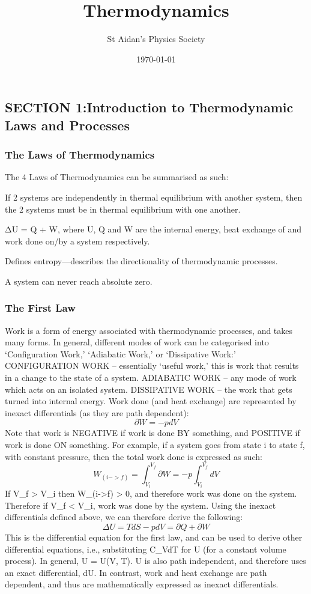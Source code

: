\documentclass{physics-notes}
\title{Thermodynamics}
\author{St Aidan's Physics Society}
\date{\today}
\begin{document}
\subsection{SECTION 1:Introduction to Thermodynamic Laws and Processes}
\subsubsection{The Laws of Thermodynamics}
The 4 Laws of Thermodynamics can be summarised as such:
\begin{description}[font=$\bullet$~\normalfont\scshape]
	\item [ZEROTH:] If 2 systems are independently in thermal equilibrium with another system, then the 2 systems must be in thermal equilibrium with one another.
	\item [FIRST:] ΔU = Q + W, where U, Q and W are the internal energy, heat exchange of and work done on/by a system respectively.
	\item [SECOND:] Defines entropy—describes the directionality of thermodynamic processes.
	\item [THIRD:] A system can never reach absolute zero. 
\end{description}
\subsubsection{The First Law}
Work is a form of energy associated with thermodynamic processes, and takes many forms. In general, different modes of work can be categorised into ‘Configuration Work,’ ‘Adiabatic Work,’ or ‘Dissipative Work:’
CONFIGURATION WORK – essentially ‘useful work,’ this is work that results in a change to the state of a system. 
ADIABATIC WORK – any mode of work which acts on an isolated system.
DISSIPATIVE WORK – the work that gets turned into internal energy.
Work done (and heat exchange) are represented by inexact differentials (as they are path dependent):
\begin{equation}
\partial W = -pdV 
\end{equation}
Note that work is NEGATIVE if work is done BY something, and POSITIVE if work is done ON something. 
For example, if a system goes from state i to state f, with constant pressure, then the total work done is expressed as such:
\begin{equation}
W_(i->f) = \int_{V_i}^{V_f} \partial W = -p \int_{V_i}^{V_f} dV
\end{equation}
If V_f > V_i then W_(i->f) > 0, and therefore work was done on the system. Therefore if V_f < V_i, work was done by the system.
Using the inexact differentials defined above, we can therefore derive the following:
\begin{equation}
\Delta U = TdS - pdV = \partial Q + \partial W
\end{equation}
This is the differential equation for the first law, and can be used to derive other differential equations, i.e., substituting C_VdT for \Delta U (for a constant volume process).
In general, U = U(V, T). U is also path independent, and therefore uses an exact differential, dU. In contrast, work and heat exchange are path dependent, and thus are mathematically expressed as inexact differentials.
\end{document}
